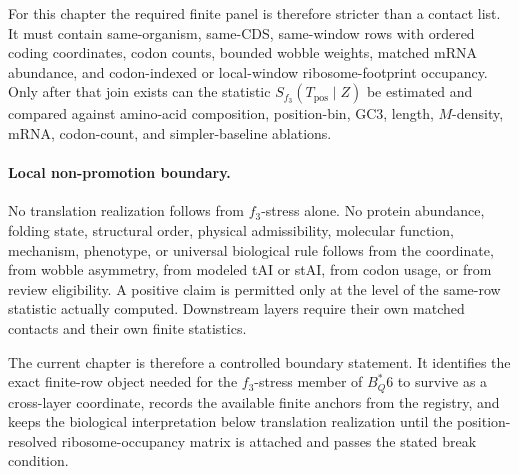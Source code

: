 For this chapter the required finite panel is therefore stricter than a contact list.  It must contain same-organism, same-CDS, same-window rows with ordered coding coordinates, codon counts, bounded wobble weights, matched mRNA abundance, and codon-indexed or local-window ribosome-footprint occupancy.  Only after that join exists can the statistic $S_{f_3}(T_{\mathrm{pos}}\mid Z)$ be estimated and compared against amino-acid composition, position-bin, GC3, length, $M$-density, mRNA, codon-count, and simpler-baseline ablations.

\paragraph{Local non-promotion boundary.}
No translation realization follows from $f_3$-stress alone.  No protein abundance, folding state, structural order, physical admissibility, molecular function, mechanism, phenotype, or universal biological rule follows from the coordinate, from wobble asymmetry, from modeled tAI or stAI, from codon usage, or from review eligibility.  A positive claim is permitted only at the level of the same-row statistic actually computed.  Downstream layers require their own matched contacts and their own finite statistics.

The current chapter is therefore a controlled boundary statement.  It identifies the exact finite-row object needed for the $f_3$-stress member of $B^*_Q6$ to survive as a cross-layer coordinate, records the available finite anchors from the registry, and keeps the biological interpretation below translation realization until the position-resolved ribosome-occupancy matrix is attached and passes the stated break condition.